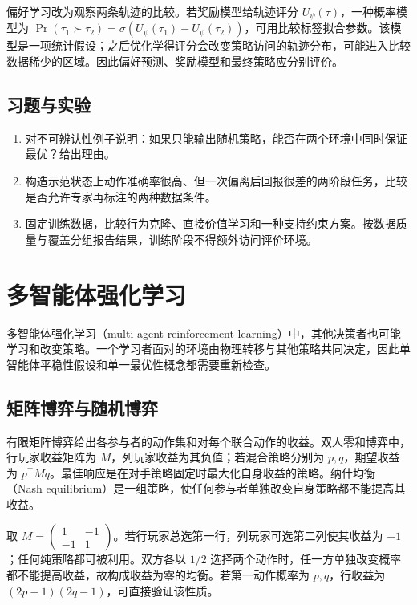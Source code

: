 \documentclass[UTF8,12pt,a4paper,fontset=fandol]{ctexbook}
\begin{document}
偏好学习改为观察两条轨迹的比较。若奖励模型给轨迹评分 $U_\psi(\tau)$，一种概率模型为 $\Pr(\tau_1\succ\tau_2)=\sigma(U_\psi(\tau_1)-U_\psi(\tau_2))$，可用比较标签拟合参数。该模型是一项统计假设；之后优化学得评分会改变策略访问的轨迹分布，可能进入比较数据稀少的区域。因此偏好预测、奖励模型和最终策略应分别评价。

\section{习题与实验}
\begin{enumerate}
\item 对不可辨认性例子说明：如果只能输出随机策略，能否在两个环境中同时保证最优？给出理由。
\item 构造示范状态上动作准确率很高、但一次偏离后回报很差的两阶段任务，比较是否允许专家再标注的两种数据条件。
\item 固定训练数据，比较行为克隆、直接价值学习和一种支持约束方案。按数据质量与覆盖分组报告结果，训练阶段不得额外访问评价环境。
\end{enumerate}

\chapter{多智能体强化学习}
\label{ch:rl-multiagent}

多智能体强化学习（multi-agent reinforcement learning）中，其他决策者也可能学习和改变策略。一个学习者面对的环境由物理转移与其他策略共同决定，因此单智能体平稳性假设和单一最优性概念都需要重新检查。

\section{矩阵博弈与随机博弈}

有限矩阵博弈给出各参与者的动作集和对每个联合动作的收益。双人零和博弈中，行玩家收益矩阵为 $M$，列玩家收益为其负值；若混合策略分别为 $p,q$，期望收益为 $p^\top Mq$。最佳响应是在对手策略固定时最大化自身收益的策略。纳什均衡（Nash equilibrium）是一组策略，使任何参与者单独改变自身策略都不能提高其收益。

\begin{example}[为什么均衡可能需要随机化]
取 $M=\left(\begin{smallmatrix}1&-1\\-1&1\end{smallmatrix}\right)$。若行玩家总选第一行，列玩家可选第二列使其收益为 $-1$；任何纯策略都可被利用。双方各以 $1/2$ 选择两个动作时，任一方单独改变概率都不能提高收益，故构成收益为零的均衡。若第一动作概率为 $p,q$，行收益为 $(2p-1)(2q-1)$，可直接验证该性质。
\end{example}
\end{document}
